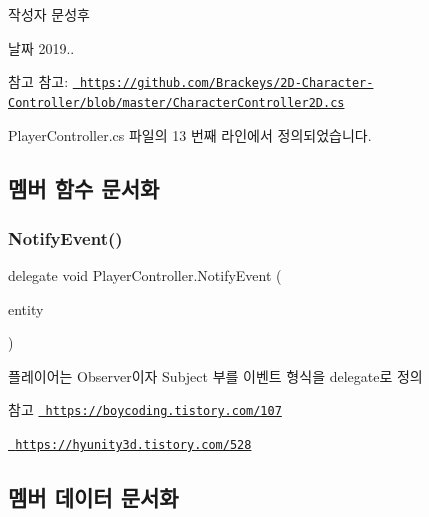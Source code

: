 \begin{DoxyAuthor}{작성자}
문성후 
\end{DoxyAuthor}
\begin{DoxyDate}{날짜}
2019.. 
\end{DoxyDate}
\begin{DoxySeeAlso}{참고}
참고\+: \href{https://github.com/Brackeys/2D-Character-Controller/blob/master/CharacterController2D.cs}{\texttt{ https\+://github.\+com/\+Brackeys/2\+D-\/\+Character-\/\+Controller/blob/master/\+Character\+Controller2\+D.\+cs}} 
\end{DoxySeeAlso}


Player\+Controller.\+cs 파일의 13 번째 라인에서 정의되었습니다.



\subsection{멤버 함수 문서화}
\mbox{\label{class_player_controller_a934c7f80b80276620cd60eaaeea7520e}} 
\subsubsection{\texorpdfstring{NotifyEvent()}{NotifyEvent()}}
{\footnotesize\ttfamily delegate void Player\+Controller.\+Notify\+Event (\begin{DoxyParamCaption}\item[{Game\+Object}]{entity }\end{DoxyParamCaption})}



플레이어는 Observer이자 Subject 부를 이벤트 형식을 delegate로 정의 

\begin{DoxySeeAlso}{참고}
\href{https://boycoding.tistory.com/107}{\texttt{ https\+://boycoding.\+tistory.\+com/107}} 

\href{https://hyunity3d.tistory.com/528}{\texttt{ https\+://hyunity3d.\+tistory.\+com/528}} 
\end{DoxySeeAlso}


\subsection{멤버 데이터 문서화}
\mbox{\label{class_player_controller_ada29d77d333483963257e51a6e15b8ae}} 
